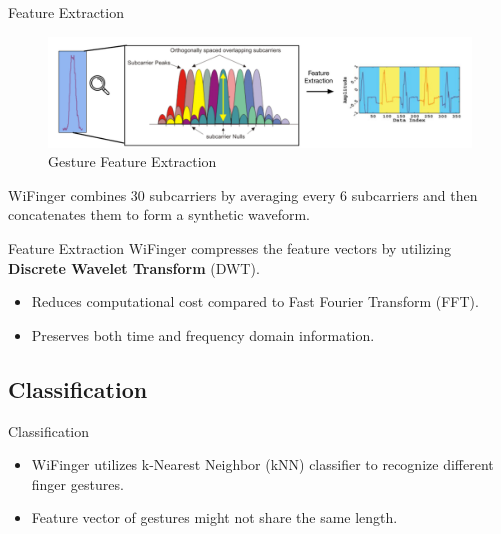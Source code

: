 \documentclass{beamer}
\begin{document}
\begin{frame}{Feature Extraction}
	\begin{center}
		\begin{figure}
			\includegraphics[width=1.\textwidth]{Images/quals-part-2-subcarriers.png}
			\caption{Gesture Feature Extraction~\cite{li2016wifinger}}
		\end{figure}
    \end{center}
WiFinger combines 30 subcarriers by averaging every 6 subcarriers and then concatenates them to form a synthetic waveform.
\end{frame}

\begin{frame}{Feature Extraction}
WiFinger compresses the feature vectors by utilizing \textbf{Discrete Wavelet Transform} (DWT).\\

	\begin{itemize}
		\item Reduces computational cost compared to Fast Fourier Transform (FFT).
		\item Preserves both time and frequency domain information.
	\end{itemize}
\end{frame}

\subsection{Classification}
\begin{frame}{Classification}
	\begin{itemize}
		\item WiFinger utilizes k-Nearest Neighbor (kNN) classifier to recognize different finger gestures. 
		\item Feature vector of gestures might not share the same length.
	\end{itemize}
\end{frame}
\end{document}
